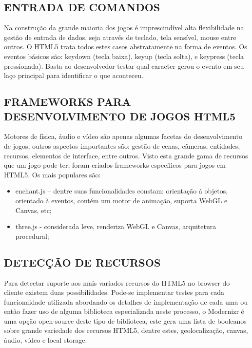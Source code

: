 \documentclass{article}
\begin{document}
\subsection{ENTRADA DE COMANDOS}


	Na construção da grande maioria dos jogos é imprescindível alta flexibilidade na gestão de entrada de dados, seja através de teclado, tela sensível, mouse entre outros. O HTML5 trata todos estes casos abstratamente na forma de eventos. Os eventos básicos são: keydown (tecla baixa), keyup (tecla solta), e keypress (tecla pressionada). Basta ao desenvolvedor testar qual caracter gerou o evento em seu laço principal para identificar o que aconteceu.


\subsection{FRAMEWORKS PARA DESENVOLVIMENTO DE JOGOS HTML5}

Motores de física, áudio e vídeo são apenas algumas facetas do desenvolvimento de jogos, outros aspectos importantes são: gestão de cenas, câmeras, entidades, recursos, elementos de interface, entre outros. Visto esta grande gama de recursos que um jogo pode ter, foram criados frameworks específicos para jogos em HTML5.
Os mais populares são:

\begin{itemize}
    \item enchant.js – dentre suas funcionalidades constam: orientação à objetos, orientado à eventos, contém um motor de animação, suporta WebGL e Canvas, etc;

    \item three.js  - considerada leve, renderiza WebGL e Canvas, arquitetura procedural;
\end{itemize}

\subsection{DETECÇÃO DE RECURSOS}

	Para detectar suporte aos mais variados recursos do HTML5 no browser do cliente existem duas possibilidades. Pode-se implementar testes para cada funcionaidade utilizada abordando os detalhes de implementação de cada uma ou então fazer uso de alguma biblioteca especializada neste processo, o Modernizr é uma opção open-source deste tipo de biblioteca, este gera uma lista de booleanos sobre grande variedade dos recursos HTML5, dentre estes, geolocalização, canvas, áudio, vídeo e local storage.
\end{document}
